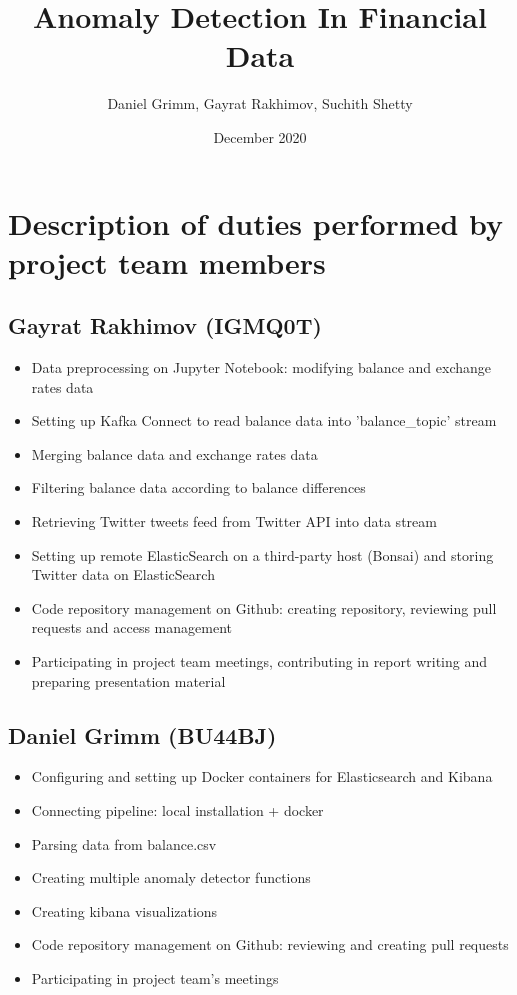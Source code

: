 \documentclass{article}
\title{Anomaly Detection In Financial Data}
\author{Daniel Grimm, Gayrat Rakhimov, Suchith Shetty}
\date{December 2020}
\begin{document}
\maketitle

\section{Description of duties performed by project team members}

\subsection{Gayrat Rakhimov (IGMQ0T)}
\begin{itemize}
    \item Data preprocessing on Jupyter Notebook: modifying balance and exchange rates data
    \item Setting up Kafka Connect to read balance data into 'balance\_topic' stream
    \item Merging balance data and exchange rates data
    \item Filtering balance data according to balance differences
    \item Retrieving Twitter tweets feed from Twitter API into data stream
    \item Setting up remote ElasticSearch on a third-party host (Bonsai) and storing Twitter data on ElasticSearch
    \item Code repository management on Github: creating repository, reviewing pull requests and access management
    \item Participating in project team meetings, contributing in report writing and preparing presentation material
\end{itemize}

\subsection{Daniel Grimm (BU44BJ)}
\begin{itemize}
    \item Configuring and setting up Docker containers for Elasticsearch and Kibana
    \item Connecting pipeline: local installation + docker
    \item Parsing data from balance.csv
    \item Creating multiple anomaly detector functions
    \item Creating kibana visualizations
    \item Code  repository  management  on  Github: reviewing and creating pull requests
    \item Participating in project team’s meetings
\end{itemize}
\end{document}
